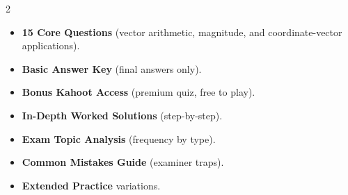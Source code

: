 \documentclass[11pt,a4paper]{article}
\newcommand{\FullReleaseDate}{April 30, 2026}
\begin{document}
\vspace{8pt}

\begin{multicols}{2}
  \begin{tcolorbox}[card, title=\sffamily\bfseries\textcolor{white}{\faHandPointDown\ TODAY (Simplified Version)}, colbacktitle=mainblue, boxed title style={sharp corners, boxrule=0pt}]
    \begin{itemize}[leftmargin=1.2em, itemsep=2pt]
      \item \small \textbf{15 Core Questions} (vector arithmetic, magnitude, and coordinate-vector applications).
      \item \small \textbf{Basic Answer Key} (final answers only).
      \item \small \textbf{Bonus Kahoot Access} (premium quiz, free to play).
    \end{itemize}
  \end{tcolorbox}

  \columnbreak

  \begin{tcolorbox}[card, title=\sffamily\bfseries\textcolor{white}{\faRocket\ ON \FullReleaseDate\ (Full Upgrade)}, colbacktitle=mainblue, boxed title style={sharp corners, boxrule=0pt}]
    \begin{itemize}[leftmargin=1.2em, itemsep=2pt]
      \item \small \textbf{In-Depth Worked Solutions} (step-by-step).
      \item \small \textbf{Exam Topic Analysis} (frequency by type).
      \item \small \textbf{Common Mistakes Guide} (examiner traps).
      \item \small \textbf{Extended Practice} variations.
    \end{itemize}
  \end{tcolorbox}
\end{multicols}
\end{document}
